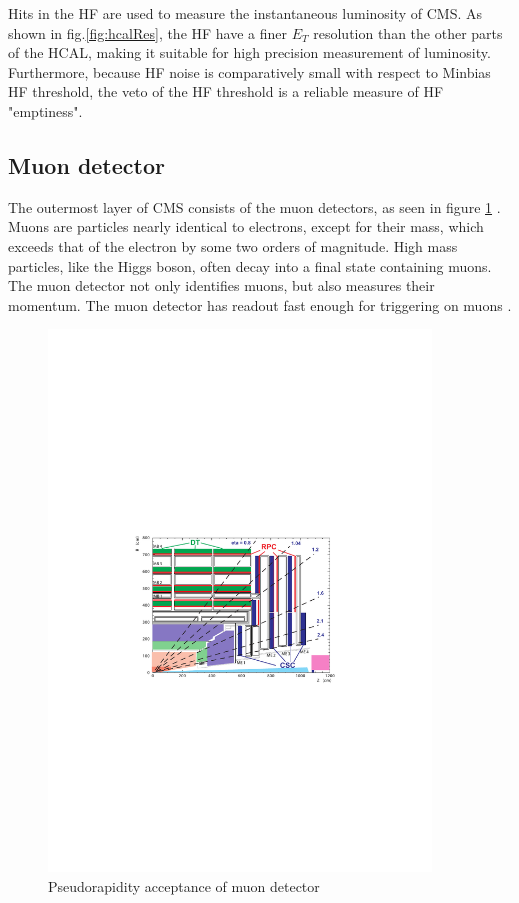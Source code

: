 Hits in the HF are used to measure the instantaneous luminosity of CMS. As shown in fig.\ref{fig:hcalRes}, the HF have a finer $E_T$ resolution than the other parts of the HCAL, making it suitable for high precision measurement of luminosity. Furthermore, because HF noise is comparatively small with respect to Minbias HF threshold, the veto of the HF threshold is a reliable measure of HF "emptiness". 

\subsection{Muon detector}

The outermost layer of CMS consists of the muon detectors, as seen in figure \ref{fig:muonYZ} \cite{Bayatian:2006nff}. Muons are particles nearly identical to electrons, except for their mass, which exceeds that of the electron by some two orders of magnitude. High mass particles, like the Higgs boson, often decay into a final state containing muons. The muon detector not only identifies muons, but also measures their momentum. The muon detector has readout fast enough for triggering on muons \cite{CMS_AN_2008-098} \cite{cmsTnP}.

\begin{figure}[h!]
\begin{centering}
\includegraphics[width=4in]{Chapter3/importfigs/Figure_001-006.pdf}
\par\end{centering}
\caption{Pseudorapidity acceptance of muon detector \cite{Bayatian:2006nff}\label{fig:muonYZ}}
\end{figure}

